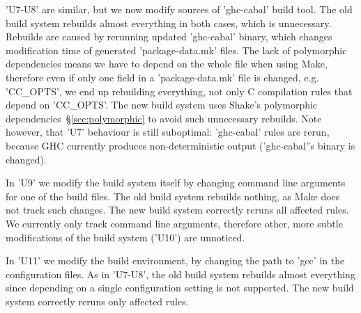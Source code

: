 \lst'U7-U8' are similar, but we now modify sources of \lst'ghc-cabal' build
tool. The old build system rebuilds almost everything in both cases,
which is unnecessary. Rebuilds are caused by rerunning updated \lst'ghc-cabal'
binary, which changes modification time of generated \lst'package-data.mk'
files. The lack of polymorphic dependencies means we have to depend on the whole
file when using Make, therefore even if only one field in a
\lst'package-data.mk' file is changed, e.g. \lst'CC_OPTS', we end up
rebuilding everything, not only C compilation rules that depend on
\lst'CC_OPTS'. The new build system uses Shake's polymorphic
dependencies~\S\ref{sec:polymorphic} to avoid such unnecessary rebuilds. Note
however, that \lst'U7' behaviour is still suboptimal: \lst'ghc-cabal' rules
are rerun, because GHC currently produces non-deterministic output
(\lst'ghc-cabal''s binary is changed).

In \lst'U9' we modify the build system itself by changing command line
arguments for one of the build files. The old build system rebuilds nothing,
as Make does not track such changes. The new build system correctly reruns all
affected rules. We currently only track command line arguments, therefore other,
more subtle modifications of the build system (\lst'U10') are unnoticed.

% 
% 

In \lst'U11' we modify the build environment, by changing the path to \lst'gcc'
in the configuration files. As in \lst'U7-U8', the old build system rebuilds
almost everything since depending on a single configuration setting is not
supported. The new build system correctly reruns only affected rules.

